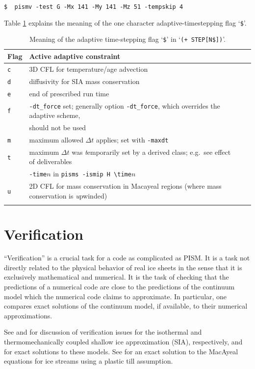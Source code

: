 \documentclass[12pt,final]{amsart}
\begin{document}
\verb|$  pismv -test G -Mx 141 -My 141 -Mz 51 -tempskip 4|

Table \ref{tab:adaptiveflag} explains the meaning of the one character adaptive-timestepping flag `\verb|$|'.

\begin{table}[h]
\caption{Meaning of the adaptive time-stepping flag `\texttt{\$}' in `\texttt{(+    STEP[N\$])}'.}\label{tab:adaptiveflag}
\begin{tabular}{@{}llll}\hline
\textbf{Flag} & \textbf{Active adaptive constraint} \\ \hline
\verb|c| & 3D CFL for temperature/age advection \cite{BBL} \\
\verb|d| & diffusivity for SIA mass conservation \cite{BBL} \\
\verb|e| & end of prescribed run time \\
\verb|f| & \verb|-dt_force| set; generally option \verb|-dt_force|, which overrides the adaptive scheme, \\
 & should not be used  \\
\verb|m| & maximum allowed $\Delta t$ applies; set with \verb|-maxdt| \\
\verb|t| & maximum $\Delta t$ was \emph{t}emporarily set by a derived class; e.g.~see effect of deliverables \\
 & \verb|-time|$n$ in \verb|pisms -ismip H \time|$n$ \\
\verb|u| & 2D CFL for mass conservation in Macayeal regions (where mass conservation is \emph{u}pwinded)\\
\hline
\normalsize
\end{tabular}
\end{table}


\clearpage\newpage
\section{Verification}\label{sect:verif}

``Verification'' is a crucial task for a code as complicated as PISM.  It is a task not directly related to the physical behavior of real ice sheets in the sense that it is exclusively mathematical and numerical.  It is the task of checking that the predictions of a numerical code are close to the predictions of the continuum model which the numerical code claims to approximate.  In particular, one compares exact solutions of the continuum model, if available, to their numerical approximations.

See \cite{BLKCB} and \cite{BBL} for discussion of verification issues for the isothermal and thermomechanically coupled shallow ice approximation (SIA), respectively, and for exact solutions to these models.  See \cite{SchoofStream} for an exact solution to the MacAyeal equations for ice streams using a plastic till assumption.
\end{document}
